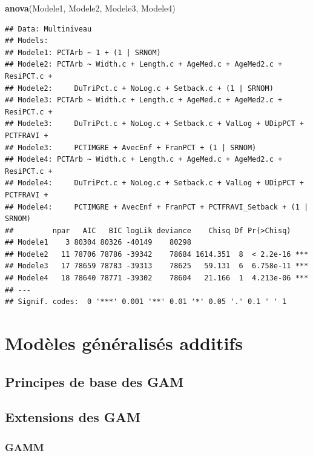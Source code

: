 \documentclass[
  11pt,
  french,
]{book}
\makeatletter
\newenvironment{Shaded}{\begin{snugshade}}{\end{snugshade}}
\newcommand{\KeywordTok}[1]{\textcolor[rgb]{0.13,0.29,0.53}{\textbf{#1}}}
\newcommand{\NormalTok}[1]{#1}
\newenvironment{kframe}{%
\medskip{}
\setlength{\fboxsep}{.8em}
 \def\at@end@of@kframe{}%
 \ifinner\ifhmode%
  \def\at@end@of@kframe{\end{minipage}}%
  \begin{minipage}{\columnwidth}%
 \fi\fi%
 \def\FrameCommand##1{\hskip\@totalleftmargin \hskip-\fboxsep
 \colorbox{shadecolor}{##1}\hskip-\fboxsep
     \hskip-\linewidth \hskip-\@totalleftmargin \hskip\columnwidth}%
 \MakeFramed {\advance\hsize-\width
   \@totalleftmargin\z@ \linewidth\hsize
   \@setminipage}}%
 {\par\unskip\endMakeFramed%
 \at@end@of@kframe}
\renewenvironment{Shaded}{\begin{kframe}}{\end{kframe}}
\makeatother
\begin{document}
\begin{Shaded}
\begin{Highlighting}[]
\KeywordTok{anova}\NormalTok{(Modele1, Modele2, Modele3, Modele4)}
\end{Highlighting}
\end{Shaded}

\begin{verbatim}
## Data: Multiniveau
## Models:
## Modele1: PCTArb ~ 1 + (1 | SRNOM)
## Modele2: PCTArb ~ Width.c + Length.c + AgeMed.c + AgeMed2.c + ResiPCT.c + 
## Modele2:     DuTriPct.c + NoLog.c + Setback.c + (1 | SRNOM)
## Modele3: PCTArb ~ Width.c + Length.c + AgeMed.c + AgeMed2.c + ResiPCT.c + 
## Modele3:     DuTriPct.c + NoLog.c + Setback.c + ValLog + UDipPCT + PCTFRAVI + 
## Modele3:     PCTIMGRE + AvecEnf + FranPCT + (1 | SRNOM)
## Modele4: PCTArb ~ Width.c + Length.c + AgeMed.c + AgeMed2.c + ResiPCT.c + 
## Modele4:     DuTriPct.c + NoLog.c + Setback.c + ValLog + UDipPCT + PCTFRAVI + 
## Modele4:     PCTIMGRE + AvecEnf + FranPCT + PCTFRAVI_Setback + (1 | SRNOM)
##         npar   AIC   BIC logLik deviance    Chisq Df Pr(>Chisq)    
## Modele1    3 80304 80326 -40149    80298                           
## Modele2   11 78706 78786 -39342    78684 1614.351  8  < 2.2e-16 ***
## Modele3   17 78659 78783 -39313    78625   59.131  6  6.758e-11 ***
## Modele4   18 78640 78771 -39302    78604   21.166  1  4.213e-06 ***
## ---
## Signif. codes:  0 '***' 0.001 '**' 0.01 '*' 0.05 '.' 0.1 ' ' 1
\end{verbatim}

\hypertarget{chap09}{%
\chapter{Modèles généralisés additifs}\label{chap09}}

\hypertarget{sect091}{%
\section{Principes de base des GAM}\label{sect091}}

\hypertarget{sect092}{%
\section{Extensions des GAM}\label{sect092}}

\hypertarget{sect0921}{%
\subsection{GAMM}\label{sect0921}}
\end{document}
